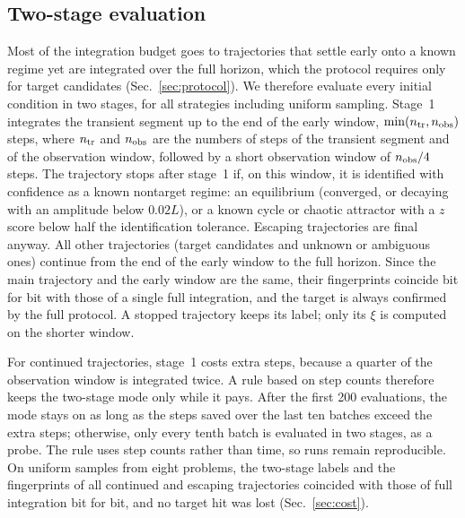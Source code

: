 \subsection{Two-stage evaluation}\label{sec:twostage}

Most of the integration budget goes to trajectories that settle early onto a known regime yet are integrated over the full horizon, which the protocol requires only for target candidates (Sec.~\ref{sec:protocol}). We therefore evaluate every initial condition in two stages, for all strategies including uniform sampling. Stage~1 integrates the transient segment up to the end of the early window, $\min(n_{\rm tr},n_{\rm obs})$ steps, where $n_{\rm tr}$ and $n_{\rm obs}$ are the numbers of steps of the transient segment and of the observation window, followed by a short observation window of $n_{\rm obs}/4$ steps. The trajectory stops after stage~1 if, on this window, it is identified with confidence as a known nontarget regime: an equilibrium (converged, or decaying with an amplitude below $0.02L$), or a known cycle or chaotic attractor with a $z$ score below half the identification tolerance. Escaping trajectories are final anyway. All other trajectories (target candidates and unknown or ambiguous ones) continue from the end of the early window to the full horizon. Since the main trajectory and the early window are the same, their fingerprints coincide bit for bit with those of a single full integration, and the target is always confirmed by the full protocol. A stopped trajectory keeps its label; only its $\xi$ is computed on the shorter window.

For continued trajectories, stage~1 costs extra steps, because a quarter of the observation window is integrated twice. A rule based on step counts therefore keeps the two-stage mode only while it pays. After the first 200 evaluations, the mode stays on as long as the steps saved over the last ten batches exceed the extra steps; otherwise, only every tenth batch is evaluated in two stages, as a probe. The rule uses step counts rather than time, so runs remain reproducible. On uniform samples from eight problems, the two-stage labels and the fingerprints of all continued and escaping trajectories coincided with those of full integration bit for bit, and no target hit was lost (Sec.~\ref{sec:cost}).
